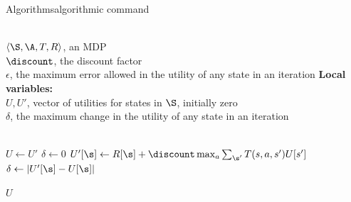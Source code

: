 \begin{frame}{Algorithms}{algorithmic command}
    \begin{scriptsize}
        \begin{algorithmic}
            \REQUIRE ~\\
                     $\langle \S, \A, T, R \rangle$, an MDP\\
                     $\discount$, the discount factor\\
                     $\epsilon$, the maximum error allowed in the utility of any state in an iteration
            \STATE \hspace{-1em}\textbf{Local variables:}\\
                    $U, U'$, vector of utilities for states in $\S$, initially zero\\
                    $\delta$, the maximum change in the utility of any state in an iteration\\
                    ~

            \REPEAT
                \STATE $U \leftarrow U'$
                \STATE $\delta \leftarrow 0$
                \FORALL{$\s \in \S$}
                    \STATE $U'[\s] \leftarrow R[\s] + \discount \max_a \sum_{\s'} T(s,a,s') U[s']$
                        \STATE $\delta \leftarrow |U'[\s] - U[\s]|$
                    \ENDIF
                \ENDFOR
            ~

            \RETURN $U$
        \end{algorithmic}
    \end{scriptsize}
\end{frame}
\note{
}



